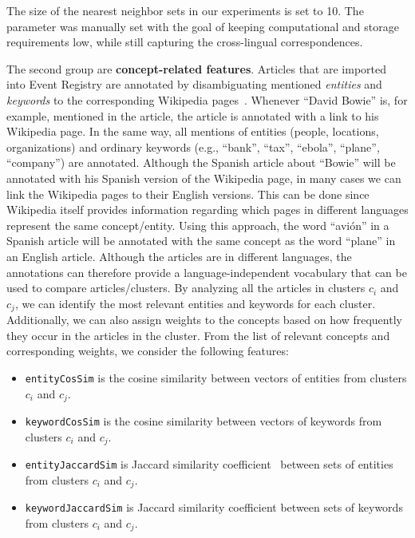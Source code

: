 \begin{remark}
The size of the nearest neighbor sets in our experiments is set to 10. The parameter was manually set with the goal of keeping computational and storage requirements
low, while still capturing the cross-lingual correspondences.
\end{remark}

The second group are {\bf concept-related features}. Articles that are imported into Event Registry
are annotated by disambiguating mentioned \emph{entities} and \emph{keywords} to the corresponding
Wikipedia pages~\cite{zhang2014}. Whenever ``David Bowie'' is, for example, mentioned in the article,
the article is annotated with a link to his Wikipedia page. In the same way, all mentions of
entities (people, locations, organizations) and ordinary keywords (e.g., ``bank'', ``tax'', ``ebola'', ``plane'', ``company'')
are annotated. Although the Spanish article about ``Bowie'' will be annotated with his Spanish
version of the Wikipedia page, in many cases we can link the Wikipedia pages to their English
versions. This can be done since Wikipedia itself provides information regarding which pages
in different languages represent the same concept/entity. Using this approach, the word ``avi\'on''
in a Spanish article will be annotated with the same concept as the word ``plane'' in an English article.
Although the articles are in different languages, the annotations can therefore provide a language-independent
vocabulary that can be used to compare articles/clusters. By analyzing all the articles in
clusters $c_i$ and $c_j$, we can identify the most relevant entities and keywords for each cluster.
Additionally, we can also assign weights to the concepts based on how frequently they occur in the
articles in the cluster. From the list of relevant concepts and corresponding weights, we consider
the following features:

\begin{itemize}
\item \texttt{entityCosSim} is the cosine similarity between vectors of entities from clusters $c_i$ and $c_j$.
\item \texttt{keywordCosSim} is the cosine similarity between vectors of keywords from clusters $c_i$ and $c_j$.
\item \texttt{entityJaccardSim} is  Jaccard similarity coefficient~\cite{levandowsky1971} between sets of entities from clusters $c_i$ and $c_j$.
\item \texttt{keywordJaccardSim} is  Jaccard similarity coefficient between sets of keywords from clusters $c_i$ and $c_j$.
\end{itemize}


